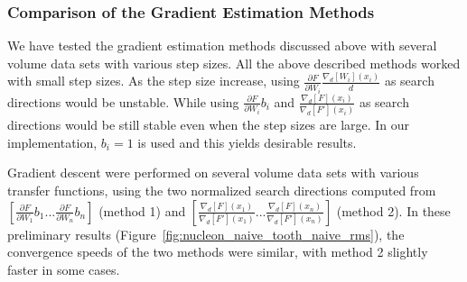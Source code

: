 \subsubsection{Comparison of the Gradient Estimation Methods}
We have tested the gradient estimation methods discussed above with several volume data sets with various step sizes.
All the above described methods worked with small step sizes. As the step size increase, using $ \frac{\partial F}{\partial W_{i}} \frac{\nabla_{d}[W_{i}](x_{i})}{d} $ as search directions would be unstable. While using $ \frac{\partial F}{\partial W_{i}} b_{i} $ and $ \frac{ \nabla_{d}[F](x_{i}) }{ \nabla_{d}[F'](x_{i}) } $ as search directions would be still stable even when the step sizes are large. In our implementation, $ b_{i}=1 $ is used and this yields desirable results.

Gradient descent were performed on several volume data sets with various transfer functions, using the two normalized search directions computed from $ [ \frac{\partial F}{\partial W_{1}} b_{1} ... \frac{\partial F}{\partial W_{n}} b_{n} ] $ (method 1)
 and 
$ [ \frac{ \nabla_{d}[F](x_{1}) }{ \nabla_{d}[F'](x_{1}) }  ... \frac{ \nabla_{d}[F](x_{n}) }{ \nabla_{d}[F'](x_{n}) } ] $ (method 2).
In these preliminary results (Figure~\ref{fig:nucleon_naive_tooth_naive_rms}), the convergence speeds of the two methods were similar, with method 2 slightly faster in some cases.

